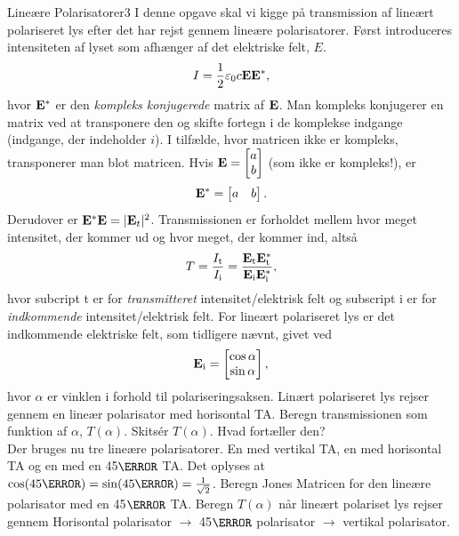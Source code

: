 \begin{opgave}{Lineære Polarisatorer}{3}
I denne opgave skal vi kigge på transmission af lineært polariseret lys efter det har rejst gennem lineære polarisatorer. 
Først introduceres intensiteten af lyset som afhænger af det elektriske felt, $E$. 
\begin{equation}
I = \frac{1}{2}\varepsilon_0c\mathbf{E}\mathbf{E^*}, 
\end{equation}
hvor $\mathbf{E^*}$ er den \emph{kompleks konjugerede} matrix af $\mathbf{E}$. Man kompleks konjugerer en matrix ved at transponere den og skifte fortegn i de komplekse indgange (indgange, der indeholder $i$). I tilfælde, hvor matricen ikke er kompleks, transponerer man blot matricen. 
Hvis $\mathbf{E} = \begin{bmatrix} a \\ b \end{bmatrix}$ (som ikke er kompleks!), er
\begin{equation}
\mathbf{E^*}=\begin{bmatrix} a & b \\ \end{bmatrix}.
\end{equation}
Derudover er $\mathbf{E}^*\mathbf{E} = |\mathbf{E}_t|^2$. 
Transmissionen er forholdet mellem hvor meget intensitet, der kommer ud og hvor meget, der kommer ind, altså 
\begin{equation}
T = \frac{I_{\text{t}}}{I_{\text{i}}} = \frac{\mathbf{E_{\text{t}}}\mathbf{E_{\text{t}}^*}}{\mathbf{E_{\text{i}}}\mathbf{E_{\text{i}}^*}},
\end{equation}
hvor subcript t er for \emph{transmitteret} intensitet/elektrisk felt og subscript i er for \emph{indkommende} intensitet/elektrisk felt. For lineært polariseret lys er det indkommende elektriske felt, som tidligere nævnt, givet ved 
\begin{equation}
\mathbf{E_{\text{i}}}=\begin{bmatrix} \cos\alpha \\ \sin\alpha \end{bmatrix},
\end{equation}
hvor $\alpha$ er vinklen i forhold til polariseringsaksen. 
\opg Linært polariseret lys rejser gennem en lineær polarisator med horisontal TA. Beregn transmissionen som funktion af $\alpha$, $T(\alpha)$. 
\opg Skitsér $T(\alpha)$. Hvad fortæller den?\\

Der bruges nu tre lineære polarisatorer. En med vertikal TA, en med horisontal TA og en med en 45$\degree$ TA. Det oplyses at $\cos(45\degree) = \sin(45\degree) = \frac{1}{\sqrt{2}}$. 
\opg Beregn Jones Matricen for den lineære polarisator med en 45$\degree$ TA.  
\opg Beregn $T(\alpha)$ når lineært polariset lys rejser gennem Horisontal polarisator $\rightarrow$ 45$\degree$ polarisator $\rightarrow$ vertikal polarisator. 
\end{opgave}

